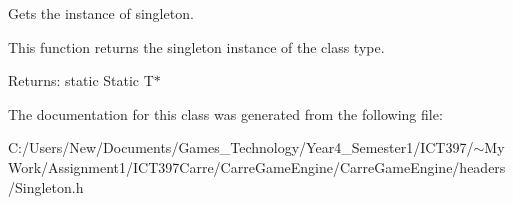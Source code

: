 Gets the instance of singleton. 

This function returns the singleton instance of the class type.

\begin{Desc}
\item[Returns:]static Static T$\ast$ \end{Desc}


The documentation for this class was generated from the following file:\begin{CompactItemize}
\item 
C:/Users/New/Documents/Games\_\-Technology/Year4\_\-Semester1/ICT397/$\sim$My Work/Assignment1/ICT397Carre/CarreGameEngine/CarreGameEngine/headers/Singleton.h\end{CompactItemize}
